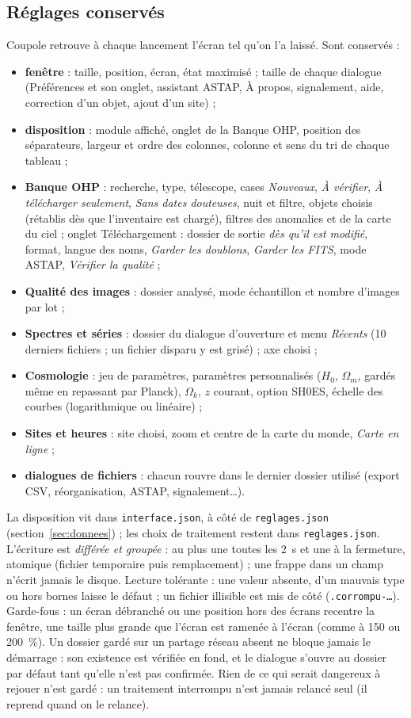 \subsection{Réglages conservés}\label{sec:conserves}
Coupole retrouve à chaque lancement l'écran tel qu'on l'a laissé. Sont conservés :
\begin{itemize}
\item \textbf{fenêtre} : taille, position, écran, état maximisé ; taille de chaque dialogue (Préférences et son
  onglet, assistant ASTAP, À propos, signalement, aide, correction d'un objet, ajout d'un site) ;
\item \textbf{disposition} : module affiché, onglet de la Banque OHP, position des séparateurs, largeur et ordre des
  colonnes, colonne et sens du tri de chaque tableau ;
\item \textbf{Banque OHP} : recherche, type, télescope, cases \emph{Nouveaux}, \emph{À vérifier}, \emph{À télécharger
  seulement}, \emph{Sans dates douteuses}, nuit et filtre, objets choisis (rétablis dès que l'inventaire est chargé),
  filtres des anomalies et de la carte du ciel ; onglet Téléchargement : dossier de sortie \emph{dès qu'il est modifié},
  format, langue des noms, \emph{Garder les doublons}, \emph{Garder les FITS}, mode ASTAP, \emph{Vérifier la qualité} ;
\item \textbf{Qualité des images} : dossier analysé, mode échantillon et nombre d'images par lot ;
\item \textbf{Spectres et séries} : dossier du dialogue d'ouverture et menu \emph{Récents} (10 derniers fichiers ;
  un fichier disparu y est grisé) ; axe choisi ;
\item \textbf{Cosmologie} : jeu de paramètres, paramètres personnalisés ($H_0$, $\Omega_m$, gardés même en repassant
  par Planck), $\Omega_k$, $z$ courant, option SH0ES, échelle des courbes (logarithmique ou linéaire) ;
\item \textbf{Sites et heures} : site choisi, zoom et centre de la carte du monde, \emph{Carte en ligne} ;
\item \textbf{dialogues de fichiers} : chacun rouvre dans le dernier dossier utilisé (export CSV, réorganisation,
  ASTAP, signalement…).
\end{itemize}
La disposition vit dans \texttt{interface.json}, à côté de \texttt{reglages.json} (section~\ref{sec:donnees}) ; les
choix de traitement restent dans \texttt{reglages.json}. L'écriture est \emph{différée et groupée} : au plus une toutes
les 2~s et une à la fermeture, atomique (fichier temporaire puis remplacement) ; une frappe dans un champ n'écrit
jamais le disque. Lecture tolérante : une valeur absente, d'un mauvais type ou hors bornes laisse le défaut ; un
fichier illisible est mis de côté (\texttt{.corrompu-…}). Garde-fous : un écran débranché ou une position hors des
écrans recentre la fenêtre, une taille plus grande que l'écran est ramenée à l'écran (comme à 150 ou 200~\%). Un
dossier gardé sur un partage réseau absent ne bloque jamais le démarrage : son existence est vérifiée en fond, et le
dialogue s'ouvre au dossier par défaut tant qu'elle n'est pas confirmée. Rien de ce qui serait dangereux à rejouer
n'est gardé : un traitement interrompu n'est jamais relancé seul (il reprend quand on le relance).

